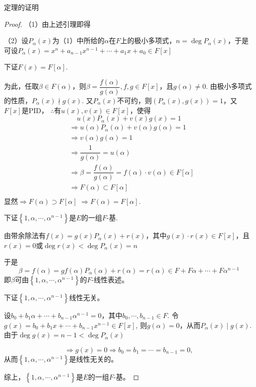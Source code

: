 \documentclass[UTF8]{article}
\begin{document}
定理的证明
\begin{proof}


（1）由上述引理即得

（2）设$P_{\alpha}(x)$为（1）中所给的$\alpha$在$F$上的极小多项式，$n=\operatorname{deg}P_{\alpha}(x)$，于是可设$P_{\alpha}(x)=x^n+a_{n-1}x^{n-1}+\cdots +a_1x+a_0\in F[x]$


下证$F(x)=F[\alpha]$.

为此，任取$\beta\in F(\alpha)$，则$\beta=\dfrac{f(\alpha)}{g(\alpha)}, f,g\in F[x]$，且$g(\alpha)\neq 0$.
由极小多项式的性质，$P_{\alpha}(x)\nmid g(x)$.
又$P_{\alpha}(x)$不可约，则$\left( P_{\alpha}(x), g(x)\right)=1$，又$F[x]$是PID，
$\therefore$有$u(x), v(x)\in F[x]$，使得
$$
u(x)P_{\alpha}(x)+v(x)g(x)=1
$$
\[
\begin{split}
&\Rightarrow u(\alpha)P_{\alpha}(\alpha)+v(\alpha)g(\alpha)=1\\
&\Rightarrow v(\alpha)g(\alpha)=1\\
& \Rightarrow\dfrac{1}{g(\alpha)}=u(\alpha)\\
& \Rightarrow\beta=\dfrac{f(\alpha)}{g(\alpha)}=f(\alpha)\cdot v(\alpha)\in F[\alpha]\\
& \Rightarrow F(\alpha)\subset F[\alpha]\\
\end{split}
\]
\quad 显然$\Rightarrow F(\alpha)\supset  F[\alpha]$
$\Rightarrow F(\alpha)=F[\alpha]$.

\quad

下证$\left\{ 1,\alpha,\cdots, \alpha^{n-1}\right\}$是$E$的一组$F$-基.

由带余除法有$f(x)=g(x)P_{\alpha}(x)+r(x)$，其中$g(x)\cdot r(x)\in F[x]$，且$r(x)=0$或$\operatorname{deg}r(x)<\operatorname{deg}P_{\alpha}(x)=n$

于是
$$
\beta=f(\alpha)=gf(\alpha)P_{\alpha}(\alpha)+r(\alpha)=r(\alpha)\in F+F\alpha+\cdots +F\alpha^{n-1}
$$
即$\beta$可由$\left\{ 1,\alpha,\cdots, \alpha^{n-1}\right\}$的$F$-线性表述。

下证$\left\{ 1,\alpha,\cdots, \alpha^{n-1}\right\}$线性无关。

设$b_0+b_1\alpha+\cdots +b_{n-1}\alpha^{n-1}=0$，其中$b_0,\cdots,b_{n-1}\in F$.
令$g(x)=b_0+b_1x+\cdots +b_{n-1}x^{n-1}\in F[x]$,
则$g(\alpha)=0$，从而$P_{\alpha}(x) \mid g(x)$.
由于$\operatorname{deg}g(x)=n-1<\operatorname{deg}P_{\alpha}(x)$

$$\Rightarrow g(x)=0\Rightarrow b_0=b_1=\cdots=b_{n-1}=0,$$
从而$\left\{ 1,\alpha,\cdots, \alpha^{n-1}\right\}$是线性无关的。

综上，$\left\{ 1,\alpha,\cdots, \alpha^{n-1}\right\}$是$E$的一组$F$-基。
\end{proof}
\end{document}
